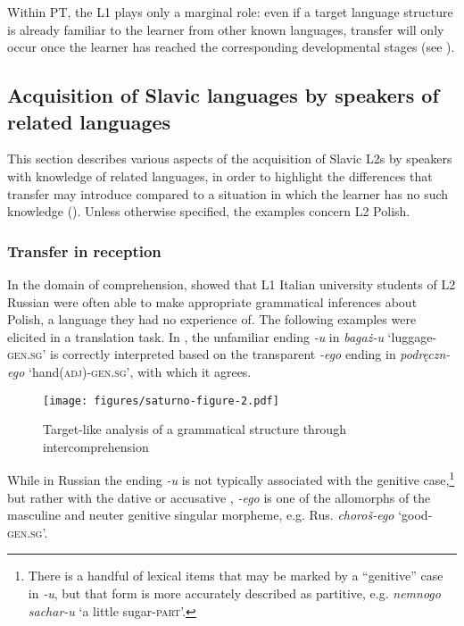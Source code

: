 \documentclass[output=paper,            colorlinks, citecolor=brown            		  ]{langscibook}
\begin{document}
Within PT, the L1 plays only a marginal role: even if a target language structure is already familiar to the learner from other known languages, transfer will only occur once the learner has reached the corresponding developmental stages (see ).

\subsection{Acquisition of Slavic languages by speakers of related languages}\label{sec:saturno:2.4}

This section describes various aspects of the acquisition of Slavic L2s by speakers with knowledge of related languages, in order to highlight the differences that transfer may introduce compared to a situation in which the learner has no such knowledge (). Unless otherwise specified, the examples concern L2 Polish.

\subsubsection{Transfer in reception}\label{sec:saturno:2.4.1}

In the domain of comprehension, \citet{Saturno2019b} showed that L1 Italian university students of L2 Russian were often able to make appropriate grammatical inferences about Polish, a language they had no experience of. The following examples were elicited in a translation task. In , the unfamiliar ending \textit{{}-u} in \textit{bagaż-u} ‘luggage-\textsc{gen.sg}’ is correctly interpreted based on the transparent \textit{{}-ego} ending in \textit{podręczn-ego} ‘hand(\textsc{adj})-\textsc{gen.sg}’, with which it agrees. 



  
\begin{figure}
 \texttt{[image: figures/saturno-figure-2.pdf]}



\caption{Target-like analysis of a grammatical structure through intercomprehension}
\label{fig:saturno:2}
\end{figure}


While in Russian the ending \textit{{}-u} is not typically associated with the genitive case,\footnote{ {There is a handful of lexical items that may be marked by a “genitive” case in} {\textit{{}-u}}{, but that form is more accurately described as partitive, e.g.} {\textit{nemnogo sachar-u}} {‘a little sugar-}{\textsc{part}}{’.} } but rather with the dative or accusative , \textit{{}-ego} is one of the allomorphs of the masculine and neuter genitive singular morpheme, e.g. Rus. \textit{choroš-ego} ‘good-\textsc{gen.sg}’.
\end{document}
